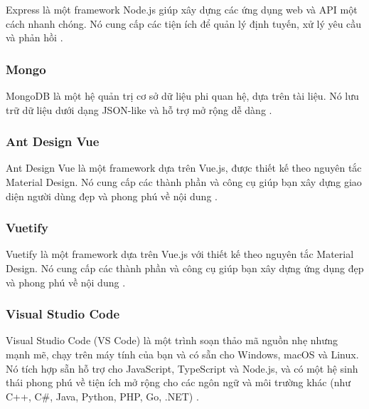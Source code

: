 Express là một framework Node.js giúp xây dựng các ứng dụng web và API một cách nhanh chóng.
Nó cung cấp các tiện ích để quản lý định tuyến, xử lý yêu cầu và phản hồi \cite{express}.

\subsubsection{Mongo}

MongoDB là một hệ quản trị cơ sở dữ liệu phi quan hệ, dựa trên tài liệu.
Nó lưu trữ dữ liệu dưới dạng JSON-like và hỗ trợ mở rộng dễ dàng \cite{mongodb}.

\subsubsection{Ant Design Vue}

Ant Design Vue là một framework dựa trên Vue.js, được thiết kế theo nguyên tắc Material Design.
Nó cung cấp các thành phần và công cụ giúp bạn xây dựng giao diện người dùng đẹp và phong phú về nội dung \cite{antdesignvue}.
\subsubsection{Vuetify}

Vuetify là một framework dựa trên Vue.js với thiết kế theo nguyên tắc Material Design.
Nó cung cấp các thành phần và công cụ giúp bạn xây dựng ứng dụng đẹp và phong phú về nội dung \cite{vuetify}.

\subsubsection{Visual Studio Code}

Visual Studio Code (VS Code) là một trình soạn thảo mã nguồn nhẹ nhưng mạnh mẽ, chạy trên máy tính của bạn và có sẵn cho Windows, macOS và Linux.
Nó tích hợp sẵn hỗ trợ cho JavaScript, TypeScript và Node.js, và có một hệ sinh thái phong phú về tiện ích mở rộng cho các ngôn ngữ và môi trường khác (như C++, C\#, Java, Python, PHP, Go, .NET) \cite{vscode}.




